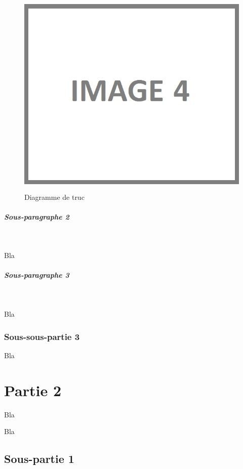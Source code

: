 \begin{figure}[H]
\begin{center}
\includegraphics[height=10cm]{autre_partie/image4}
\end{center}
\caption{Diagramme de truc}
\end{figure}

\subparagraph{Sous-paragraphe 2}
~\\
\hskip7mm

Bla\\


\subparagraph{Sous-paragraphe 3}
~\\
\hskip7mm

Bla

\subsubsection{Sous-sous-partie 3}

Bla

\section{Partie 2}

Bla


Bla

\subsection{Sous-partie 1}

